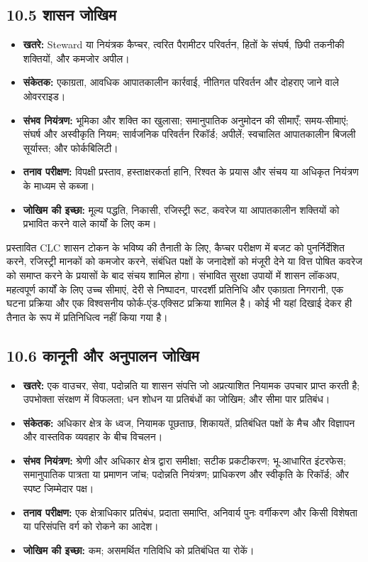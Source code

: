 \documentclass[11pt]{article}
\begin{document}
\subsection*{10.5 शासन जोखिम}

\begin{itemize}[leftmargin=*]
\item \textbf{खतरे:} Steward या नियंत्रक कैप्चर, त्वरित पैरामीटर परिवर्तन, हितों के संघर्ष, छिपी तकनीकी शक्तियों, और कमजोर अपील।
\item \textbf{संकेतक:} एकाग्रता, आवधिक आपातकालीन कार्रवाई, नीतिगत परिवर्तन और दोहराए जाने वाले ओवरराइड।
\item \textbf{संभव नियंत्रण:} भूमिका और शक्ति का खुलासा; समानुपातिक अनुमोदन की सीमाएँ; समय-सीमाएं; संघर्ष और अस्वीकृति नियम; सार्वजनिक परिवर्तन रिकॉर्ड; अपीलें; स्वचालित आपातकालीन बिजली सूर्यास्त; और फोर्कबिलिटी।
\item \textbf{तनाव परीक्षण:} विपक्षी प्रस्ताव, हस्ताक्षरकर्ता हानि, रिश्वत के प्रयास और संचय या अधिकृत नियंत्रण के माध्यम से कब्जा।
\item \textbf{जोखिम की इच्छा:} मूल्य पद्धति, निकासी, रजिस्ट्री रूट, कवरेज या आपातकालीन शक्तियों को प्रभावित करने वाले कार्यों के लिए कम।
\end{itemize}
प्रस्तावित CLC शासन टोकन के भविष्य की तैनाती के लिए, कैप्चर परीक्षण में बजट को पुनर्निर्देशित करने, रजिस्ट्री मानकों को कमजोर करने, संबंधित पक्षों के जनादेशों को मंजूरी देने या वित्त पोषित कवरेज को समाप्त करने के प्रयासों के बाद संचय शामिल होगा। संभावित सुरक्षा उपायों में शासन लॉकअप, महत्वपूर्ण कार्यों के लिए उच्च सीमाएं, देरी से निष्पादन, पारदर्शी प्रतिनिधि और एकाग्रता निगरानी, एक घटना प्रक्रिया और एक विश्वसनीय फोर्क-एंड-एक्सिट प्रक्रिया शामिल है। कोई भी यहां दिखाई देकर ही तैनात के रूप में प्रतिनिधित्व नहीं किया गया है।

\subsection*{10.6 कानूनी और अनुपालन जोखिम}

\begin{itemize}[leftmargin=*]
\item \textbf{खतरे:} एक वाउचर, सेवा, पदोन्नति या शासन संपत्ति जो अप्रत्याशित नियामक उपचार प्राप्त करती है; उपभोक्ता संरक्षण में विफलता; धन शोधन या प्रतिबंधों का जोखिम; और सीमा पार प्रतिबंध।
\item \textbf{संकेतक:} अधिकार क्षेत्र के ध्वज, नियामक पूछताछ, शिकायतें, प्रतिबंधित पक्षों के मैच और विज्ञापन और वास्तविक व्यवहार के बीच विचलन।
\item \textbf{संभव नियंत्रण:} श्रेणी और अधिकार क्षेत्र द्वारा समीक्षा; सटीक प्रकटीकरण; भू-आधारित इंटरफेस; समानुपातिक पात्रता या प्रमाणन जांच; पदोन्नति नियंत्रण; प्राधिकरण और स्वीकृति के रिकॉर्ड; और स्पष्ट जिम्मेदार पक्ष।
\item \textbf{तनाव परीक्षण:} एक क्षेत्राधिकार प्रतिबंध, प्रदाता समाप्ति, अनिवार्य पुनः वर्गीकरण और किसी विशेषता या परिसंपत्ति वर्ग को रोकने का आदेश।
\item \textbf{जोखिम की इच्छा:} कम; असमर्थित गतिविधि को प्रतिबंधित या रोकें।
\end{itemize}
\end{document}
